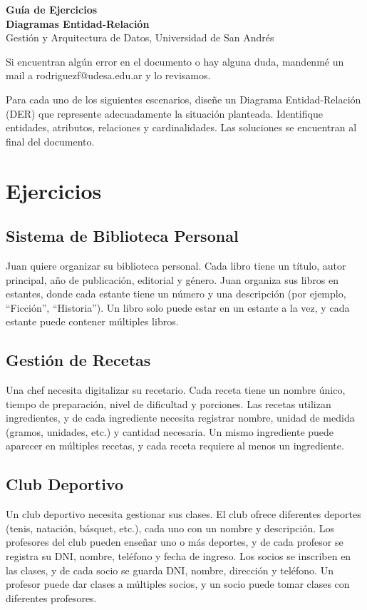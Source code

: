 \documentclass[12pt]{article}
\begin{document}
\begin{center}
  {\LARGE \textbf{Guía de Ejercicios \\ Diagramas Entidad-Relación}}\\[0.5em]
  {Gestión y Arquitectura de Datos, Universidad de San Andrés}
\end{center}

Si encuentran algún error en el documento o hay alguna duda, mandenmé un mail a rodriguezf@udesa.edu.ar y lo revisamos.

\vspace{1em}

Para cada uno de los siguientes escenarios, diseñe un Diagrama Entidad-Relación (DER) que represente adecuadamente la situación planteada. Identifique entidades, atributos, relaciones y cardinalidades. Las soluciones se encuentran al final del documento.

\section{Ejercicios}

\subsection{Sistema de Biblioteca Personal}
Juan quiere organizar su biblioteca personal. Cada libro tiene un título, autor principal, año de publicación, editorial y género. Juan organiza sus libros en estantes, donde cada estante tiene un número y una descripción (por ejemplo, ``Ficción'', ``Historia''). Un libro solo puede estar en un estante a la vez, y cada estante puede contener múltiples libros.

\subsection{Gestión de Recetas}
Una chef necesita digitalizar su recetario. Cada receta tiene un nombre único, tiempo de preparación, nivel de dificultad y porciones. Las recetas utilizan ingredientes, y de cada ingrediente necesita registrar nombre, unidad de medida (gramos, unidades, etc.) y cantidad necesaria. Un mismo ingrediente puede aparecer en múltiples recetas, y cada receta requiere al menos un ingrediente.

\subsection{Club Deportivo}
Un club deportivo necesita gestionar sus clases. El club ofrece diferentes deportes (tenis, natación, básquet, etc.), cada uno con un nombre y descripción. Los profesores del club pueden enseñar uno o más deportes, y de cada profesor se registra su DNI, nombre, teléfono y fecha de ingreso. Los socios se inscriben en las clases, y de cada socio se guarda DNI, nombre, dirección y teléfono. Un profesor puede dar clases a múltiples socios, y un socio puede tomar clases con diferentes profesores.
\end{document}

